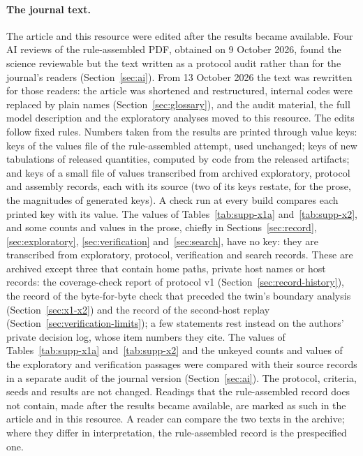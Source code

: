\paragraph{The journal text.}
The article and this resource were edited after the results became available. Four AI reviews of the rule-assembled PDF, obtained on 9 October 2026, found the science reviewable but the text written as a protocol audit rather than for the journal's readers (Section~\ref{sec:ai}). From 13 October 2026 the text was rewritten for those readers: the article was shortened and restructured, internal codes were replaced by plain names (Section~\ref{sec:glossary}), and the audit material, the full model description and the exploratory analyses moved to this resource. The edits follow fixed rules. Numbers taken from the results are printed through value keys: keys of the values file of the rule-assembled attempt, used unchanged; keys of new tabulations of released quantities, computed by code from the released artifacts; and keys of a small file of values transcribed from archived exploratory, protocol and assembly records, each with its source (two of its keys restate, for the prose, the magnitudes of generated keys). A check run at every build compares each printed key with its value. The values of Tables~\ref{tab:supp-x1a} and~\ref{tab:supp-x2}, and some counts and values in the prose, chiefly in Sections~\ref{sec:record}, \ref{sec:exploratory}, \ref{sec:verification} and~\ref{sec:search}, have no key: they are transcribed from exploratory, protocol, verification and search records. These are archived except three that contain home paths, private host names or host records: the coverage-check report of protocol v1 (Section~\ref{sec:record-history}), the record of the byte-for-byte check that preceded the twin's boundary analysis (Section~\ref{sec:x1-x2}) and the record of the second-host replay (Section~\ref{sec:verification-limits}); a few statements rest instead on the authors' private decision log, whose item numbers they cite. The values of Tables~\ref{tab:supp-x1a} and~\ref{tab:supp-x2} and the unkeyed counts and values of the exploratory and verification passages were compared with their source records in a separate audit of the journal version (Section~\ref{sec:ai}). The protocol, criteria, seeds and results are not changed. Readings that the rule-assembled record does not contain, made after the results became available, are marked as such in the article and in this resource. A reader can compare the two texts in the archive; where they differ in interpretation, the rule-assembled record is the prespecified one.

